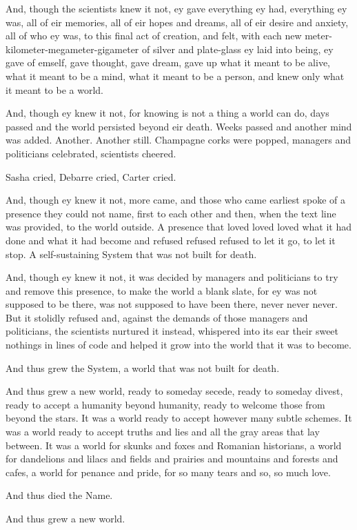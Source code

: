 And, though the scientists knew it not, ey gave everything ey had, everything ey was, all of eir memories, all of eir hopes and dreams, all of eir desire and anxiety, all of who ey was, to this final act of creation, and felt, with each new meter-kilometer-megameter-gigameter of silver and plate-glass ey laid into being, ey gave of emself, gave thought, gave dream, gave up what it meant to be alive, what it meant to be a mind, what it meant to be a person, and knew only what it meant to be a world.

And, though ey knew it not, for knowing is not a thing a world can do, days passed and the world persisted beyond eir death. Weeks passed and another mind was added. Another. Another still. Champagne corks were popped, managers and politicians celebrated, scientists cheered.

Sasha cried, Debarre cried, Carter cried.

And, though ey knew it not, more came, and those who came earliest spoke of a presence they could not name, first to each other and then, when the text line was provided, to the world outside. A presence that loved loved loved what it had done and what it had become and refused refused refused to let it go, to let it stop. A self-sustaining System that was not built for death.

And, though ey knew it not, it was decided by managers and politicians to try and remove this presence, to make the world a blank slate, for ey was not supposed to be there, was not supposed to have been there, never never never. But it stolidly refused and, against the demands of those managers and politicians, the scientists nurtured it instead, whispered into its ear their sweet nothings in lines of code and helped it grow into the world that it was to become.

And thus grew the System, a world that was not built for death.

And thus grew a new world, ready to someday secede, ready to someday divest, ready to accept a humanity beyond humanity, ready to welcome those from beyond the stars. It was a world ready to accept however many subtle schemes. It was a world ready to accept truths and lies and all the gray areas that lay between. It was a world for skunks and foxes and Romanian historians, a world for dandelions and lilacs and fields and prairies and mountains and forests and cafes, a world for penance and pride, for so many tears and so, so much love.

And thus died the Name.

And thus grew a new world.
